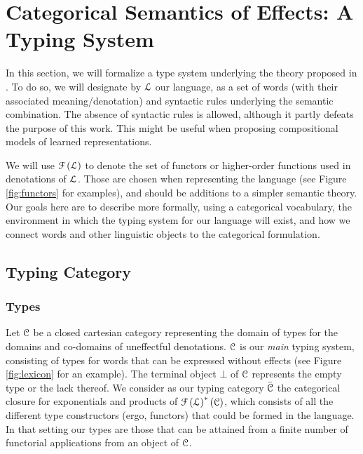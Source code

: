 \section{Categorical Semantics of Effects: A Typing System}
\label{sec:typingsystem}
In this section, we will formalize a type system underlying the theory proposed
in \cite{bumfordEffectdrivenInterpretationFunctors2025}.
To do so, we will designate by $\mathcal{L}$ our language, as a set of words
(with their associated meaning/denotation) and syntactic rules underlying
the semantic combination.
The absence of syntactic rules is allowed, although it partly defeats the
purpose of this work.
This might be useful when proposing compositional models of learned
representations.

We will use $\mathcal{F}\left( \mathcal{L} \right)$ to denote the set of functors or
higher-order functions used in denotations of $\mathcal{L}$.
Those are chosen when representing the language (see Figure \ref{fig:functors}
for examples), and should be additions to a simpler semantic theory.
Our goals here are to describe more formally, using a categorical vocabulary,
the environment in which the typing system for our language will exist, and how
we connect words and other linguistic objects to the categorical formulation.

\subsection{Typing Category}
\subsubsection{Types}
Let $\mathcal{C}$ be a closed cartesian category representing the
domain of types for the domains and co-domains of uneffectful denotations.
$\mathcal{C}$ is our \emph{main} typing system, consisting of types for words
that can be expressed without effects (see Figure \ref{fig:lexicon} for an
example).
The terminal object $\bot$ of $\mathcal{C}$ represents the empty type or the lack
thereof.
We consider as our typing category $\bar{\mathcal{C}}$ the categorical closure for
exponentials and products of $\mathcal{F}\left( \mathcal{L} \right)^{*}\left(\mathcal{C}\right)$,
which consists of all the different type constructors (ergo, functors) that
could be formed in the language.
In that setting our types are those that can be attained from a finite number
of functorial applications from an object of $\mathcal{C}$.

